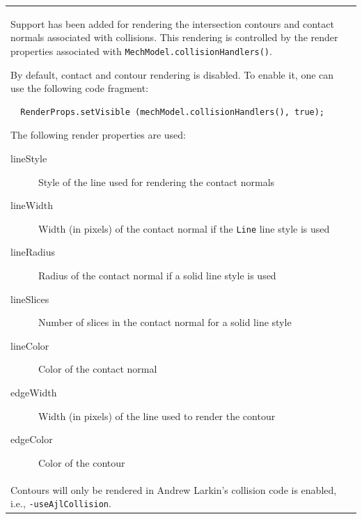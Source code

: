 \documentclass{article}
\begin{document}
\begin{tabular}{ll}
Support has been added for rendering the intersection contours and
contact normals associated with collisions. This rendering is
controlled by the render properties associated with
{\tt MechModel.collisionHandlers()}. 

By default, contact and contour rendering is disabled. To enable it,
one can use the following code fragment:

\begin{verbatim}
  RenderProps.setVisible (mechModel.collisionHandlers(), true);
\end{verbatim}

The following render properties are used:

\begin{description}

\item[lineStyle] \mbox{}

Style of the line used for rendering the contact normals

\item[lineWidth] \mbox{}

Width (in pixels) of the contact normal if the {\tt Line} line style is used

\item[lineRadius] \mbox{}

Radius of the contact normal if a solid line style is used

\item[lineSlices] \mbox{}

Number of slices in the contact normal for a solid line style

\item[lineColor] \mbox{}

Color of the contact normal

\item[edgeWidth] \mbox{}

Width (in pixels) of the line used to render the contour

\item[edgeColor] \mbox{}

Color of the contour

\end{description}

\begin{sideblock}
{\bf Note:}\\
Contours will only be rendered in Andrew Larkin's collision
code is enabled, i.e., {\tt -useAjlCollision}.
\end{sideblock}


\end{tabular}
\end{document}

